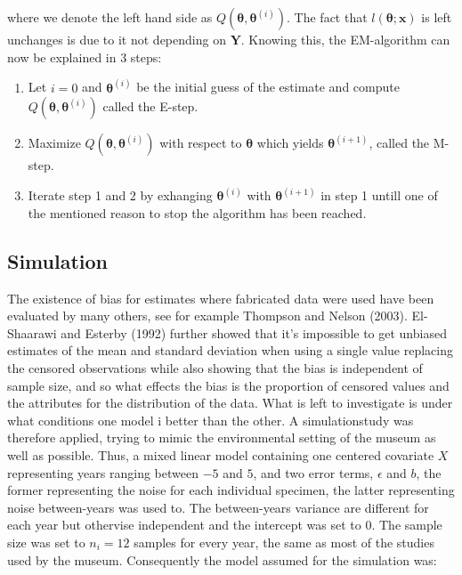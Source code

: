\documentclass[]{article}
\providecommand{\tightlist}{%
  \setlength{\itemsep}{0pt}\setlength{\parskip}{0pt}}
\begin{document}
where we denote the left hand side as
\(Q(\mathbf{\theta}, \mathbf{\theta}^{(i)})\). The fact that
\(l(\mathbf{\theta};\mathbf{x})\) is left unchanges is due to it not
depending on \(\mathbf{Y}\). Knowing this, the EM-algorithm can now be
explained in 3 steps:

\begin{enumerate}
\def\labelenumi{\arabic{enumi}.}
\tightlist
\item
  Let \(i = 0\) and \(\mathbf{\theta}^{(i)}\) be the initial guess of
  the estimate and compute \(Q(\mathbf{\theta}, \mathbf{\theta}^{(i)})\)
  called the E-step.
\item
  Maximize \(Q(\mathbf{\theta}, \mathbf{\theta}^{(i)})\) with respect to
  \(\mathbf{\theta}\) which yields \(\mathbf{\theta}^{(i+1)}\), called
  the M-step.
\item
  Iterate step 1 and 2 by exhanging \(\mathbf{\theta}^{(i)}\) with
  \(\mathbf{\theta}^{(i+1)}\) in step 1 untill one of the mentioned
  reason to stop the algorithm has been reached.
\end{enumerate}

\subsection{Simulation}\label{simulation}

The existence of bias for estimates where fabricated data were used have
been evaluated by many others, see for example Thompson and Nelson
(2003). El-Shaarawi and Esterby (1992) further showed that it's
impossible to get unbiased estimates of the mean and standard deviation
when using a single value replacing the censored observations while also
showing that the bias is independent of sample size, and so what effects
the bias is the proportion of censored values and the attributes for the
distribution of the data. What is left to investigate is under what
conditions one model i better than the other. A simulationstudy was
therefore applied, trying to mimic the environmental setting of the
museum as well as possible. Thus, a mixed linear model containing one
centered covariate \(X\) representing years ranging between \(-5\) and
\(5\), and two error terms, \(\epsilon\) and \(b\), the former
representing the noise for each individual specimen, the latter
representing noise between-years was used to. The between-years variance
are different for each year but othervise independent and the intercept
was set to \(0\). The sample size was set to \(n_i=12\) samples for
every year, the same as most of the studies used by the museum.
Consequently the model assumed for the simulation was:
\end{document}
